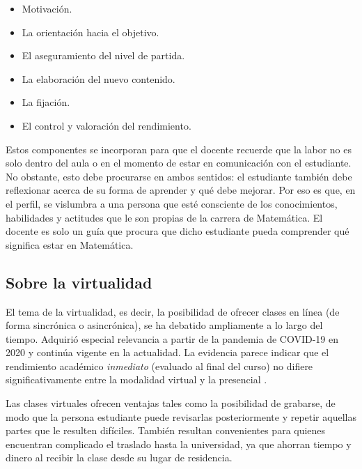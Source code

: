 \begin{itemize}
    
    \color{blue} \item \color{black} Motivación.

     \color{blue} \item \color{black} La orientación hacia el objetivo. 
     
    \color{blue} \item \color{black} El aseguramiento del nivel de partida. 
    
    \color{blue} \item \color{black} La elaboración del nuevo contenido.  
    
    \color{blue} \item \color{black} La fijación. 
    
    \color{blue} \item \color{black} El control y valoración del rendimiento.
    \end{itemize}

Estos componentes se incorporan para que el docente recuerde que la labor no es solo dentro del aula o en el momento de estar en comunicación con el estudiante. No obstante, esto debe procurarse en ambos sentidos: el estudiante también debe reflexionar acerca de su forma de aprender y qué debe mejorar. Por eso es que, en el perfil, se vislumbra a una persona que esté consciente de los conocimientos, habilidades y actitudes que le son propias de la carrera de Matemática. El docente es solo un guía que procura que dicho estudiante pueda comprender qué significa estar en Matemática.  


\subsection{Sobre la virtualidad}

El tema de la virtualidad, es decir, la posibilidad de ofrecer clases en línea (de forma sincrónica o asincrónica), se ha debatido ampliamente a lo largo del tiempo. Adquirió especial relevancia a partir de la pandemia de COVID-19 en 2020 y continúa vigente en la actualidad. La evidencia parece indicar que el rendimiento académico \textit{inmediato} (evaluado al final del curso) no difiere significativamente entre la modalidad virtual y la presencial \cite{hachey2022post}.

Las clases virtuales ofrecen ventajas tales como la posibilidad de grabarse, de modo que la persona estudiante puede revisarlas posteriormente y repetir aquellas partes que le resulten difíciles. También resultan convenientes para quienes encuentran complicado el traslado hasta la universidad, ya que ahorran tiempo y dinero al recibir la clase desde su lugar de residencia.

